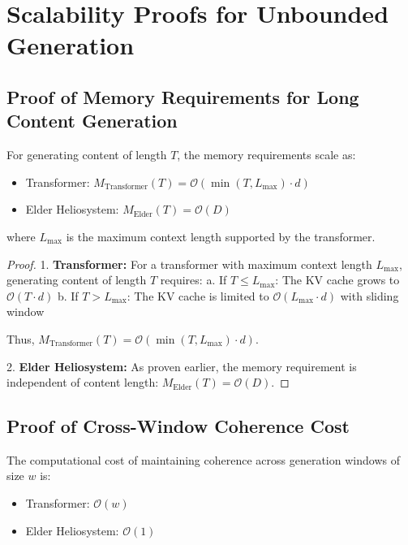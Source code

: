 \section{Scalability Proofs for Unbounded Generation}

\subsection{Proof of Memory Requirements for Long Content Generation}

\begin{theorem}
For generating content of length $T$, the memory requirements scale as:
\begin{itemize}
    \item Transformer: $M_{\text{Transformer}}(T) = \mathcal{O}(\min(T, L_{\max}) \cdot d)$
    \item Elder Heliosystem: $M_{\text{Elder}}(T) = \mathcal{O}(D)$
\end{itemize}
where $L_{\max}$ is the maximum context length supported by the transformer.
\end{theorem}

\begin{proof}
1. \textbf{Transformer:}
   For a transformer with maximum context length $L_{\max}$, generating content of length $T$ requires:
   a. If $T \leq L_{\max}$: The KV cache grows to $\mathcal{O}(T \cdot d)$
   b. If $T > L_{\max}$: The KV cache is limited to $\mathcal{O}(L_{\max} \cdot d)$ with sliding window
   
   Thus, $M_{\text{Transformer}}(T) = \mathcal{O}(\min(T, L_{\max}) \cdot d)$.

2. \textbf{Elder Heliosystem:}
   As proven earlier, the memory requirement is independent of content length:
   $M_{\text{Elder}}(T) = \mathcal{O}(D)$.
\end{proof}

\subsection{Proof of Cross-Window Coherence Cost}

\begin{theorem}
The computational cost of maintaining coherence across generation windows of size $w$ is:
\begin{itemize}
    \item Transformer: $\mathcal{O}(w)$
    \item Elder Heliosystem: $\mathcal{O}(1)$
\end{itemize}
\end{theorem}


